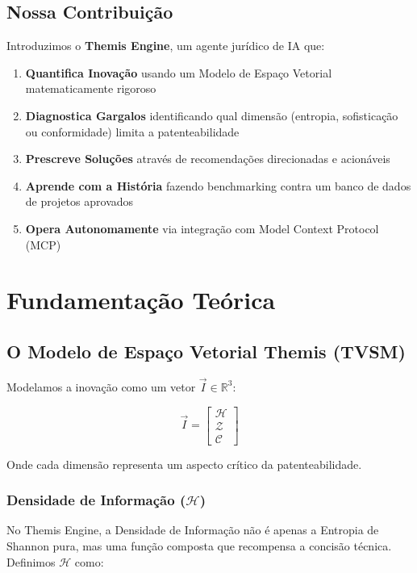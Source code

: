 \documentclass[12pt,a4paper]{article}
\begin{document}
\subsection{Nossa Contribuição}

Introduzimos o \textbf{Themis Engine}, um agente jurídico de IA que:
\begin{enumerate}
    \item \textbf{Quantifica Inovação} usando um Modelo de Espaço Vetorial matematicamente rigoroso
    \item \textbf{Diagnostica Gargalos} identificando qual dimensão (entropia, sofisticação ou conformidade) limita a patenteabilidade
    \item \textbf{Prescreve Soluções} através de recomendações direcionadas e acionáveis
    \item \textbf{Aprende com a História} fazendo benchmarking contra um banco de dados de projetos aprovados
    \item \textbf{Opera Autonomamente} via integração com Model Context Protocol (MCP)
\end{enumerate}

\section{Fundamentação Teórica}

\subsection{O Modelo de Espaço Vetorial Themis (TVSM)}

Modelamos a inovação como um vetor $\vec{I} \in \mathbb{R}^3$:

\begin{equation}
\vec{I} = \begin{bmatrix} \mathcal{H} \\ \mathcal{Z} \\ \mathcal{C} \end{bmatrix}
\end{equation}

Onde cada dimensão representa um aspecto crítico da patenteabilidade.

\subsubsection{Densidade de Informação ($\mathcal{H}$)}
\label{sub:densidade}

No Themis Engine, a Densidade de Informação não é apenas a Entropia de Shannon pura, mas uma função composta que recompensa a concisão técnica. Definimos $\mathcal{H}$ como:
\end{document}
